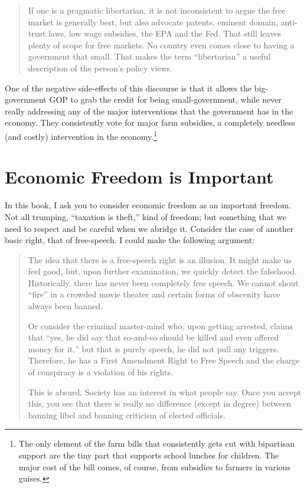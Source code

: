 \begin{quote}
If one is a pragmatic libertarian, it is not inconsistent to argue the free
market is generally best, but also advocate patents, eminent domain, anti-trust
laws, low wage subsidies, the EPA and the Fed.  That still leaves plenty of
scope for free markets.  No country even comes close to having a government
that small.  That makes the term ``libertarian'' a useful description of the
person's policy views.
\end{quote}

One of the negative side-effects of this discourse is that it allows the
big-government GOP to grab the credit for being small-government, while never
really addressing any of the major interventions that the government has in the
economy. They consistently vote for major farm subsidies, a completely needless
(and costly) intervention in the economy.\footnote{The only element of the farm
bills that consistently gets cut with bipartisan support are the tiny part that
supports school lunches for children. The major cost of the bill comes, of
course, from subsidies to farmers in various guises.}


\section{Economic Freedom is Important}

In this book, I ask you to consider economic freedom as an important freedom.
Not all trumping, ``taxation is theft,'' kind of freedom; but something that we
need to respect and be careful when we abridge it. Consider the case of another
basic right, that of free-speech. I could make the following argument:

\begin{quote}
The idea that there is a free-speech right is an illusion. It might make us
feel good, but, upon further examination, we quickly detect the falsehood.
Historically, there has never been completely free speech. We cannot shout
``fire'' in a crowded movie theater and certain forms of obscenity have always
been banned.

Or consider the criminal master-mind who, upon getting arrested, claims that
``yes, he did say that so-and-so should be killed and even offered money for
it,'' but that is purely speech, he did not pull any triggers. Therefore, he
has a First Amendment Right to Free Speech and the charge of conspiracy is a
violation of his rights.

This is absurd. Society has an interest in what people say. Once you accept
this, you see that there is really no difference (except in degree) between
banning libel and banning criticism of elected officials.
\end{quote}

